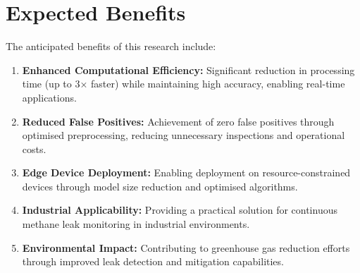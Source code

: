 \section{Expected Benefits}

The anticipated benefits of this research include:

\begin{enumerate}
\item \textbf{Enhanced Computational Efficiency:} Significant reduction in processing time (up to 3× faster) while maintaining high accuracy, enabling real-time applications.

\item \textbf{Reduced False Positives:} Achievement of zero false positives through optimised preprocessing, reducing unnecessary inspections and operational costs.

\item \textbf{Edge Device Deployment:} Enabling deployment on resource-constrained devices through model size reduction and optimised algorithms.

\item \textbf{Industrial Applicability:} Providing a practical solution for continuous methane leak monitoring in industrial environments.

\item \textbf{Environmental Impact:} Contributing to greenhouse gas reduction efforts through improved leak detection and mitigation capabilities.
\end{enumerate}